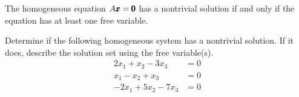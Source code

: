 \begin{remark}
    The homogeneous equation $A \pmb{x} = \pmb{0}$ has a nontrivial solution if and only if the equation has at least one free variable.
\end{remark}

\begin{example}
    Determine if the following homogeneous system has a nontrivial solution. If it does, describe the solution set using the free variable(s).
\[
\begin{aligned}
2 x_1+x_2-3 x_3 & =0 \\
x_1-x_2+x_3 & =0 \\
-2 x_1+5 x_2-7 x_3 & =0
\end{aligned}
\]

\end{example}

